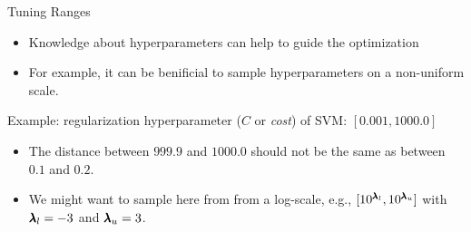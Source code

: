 
\subtitle{Example and Practical Hints}





\maketitle



\begin{frame}[allowframebreaks]{Tuning Ranges}

\begin{itemize}
	\item Knowledge about hyperparameters can help to guide the optimization
	\item For example, it can be benificial to sample hyperparameters on a non-uniform scale.
\end{itemize}

    \vspace{0.2cm}
Example: regularization hyperparameter ($C$ or \emph{cost}) of SVM: $[0.001, 1000.0]$

\begin{itemize}
	\item The distance between $999.9$ and $1000.0$ should not be the same as between $0.1$ and $0.2$.
  \item We might want to sample here from from a log-scale, e.g., $[10^{\pmb{\lambda}_l}, 10^{\pmb{\lambda}_u}]$ with $\pmb{\lambda}_l = -3$ and $\pmb{\lambda}_u = 3$.
\end{itemize}

\begin{figure}[htb]
\centering
\end{figure}


\end{frame}
